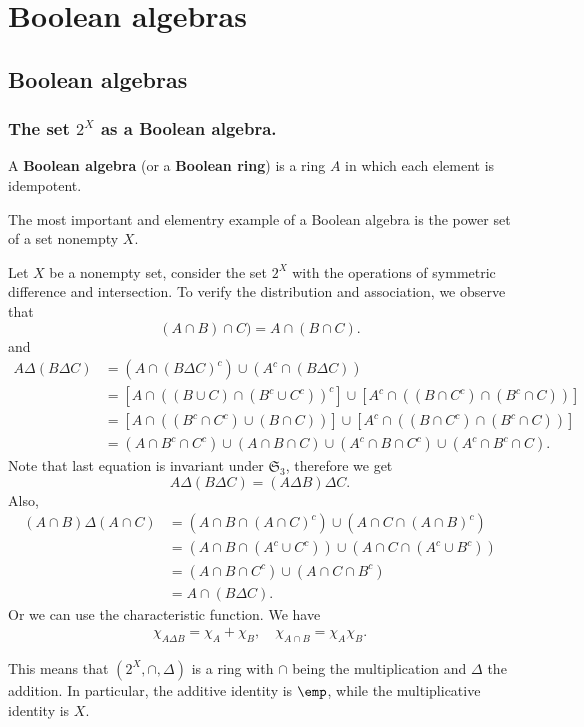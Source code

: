 \chapter{Boolean algebras}
\section{Boolean algebras}
\subsection{The set $2^X$ as a Boolean algebra.}
\begin{definition}
A \textbf{Boolean algebra} (or a \textbf{Boolean ring}) is a ring $A$ in which each element is idempotent.
\end{definition}
The most important and elementry example of a Boolean algebra is the power set of a set nonempty $X$.
\begin{example}\label{Bool ring 2^X}
Let $X$ be a nonempty set, consider the set $2^X$ with the operations of symmetric difference and intersection. 
To verify the distribution and association, we observe that
\[(A\cap B)\cap C)=A\cap(B\cap C).\]
and
\begin{align*}
A\Delta(B\Delta C)&=(A\cap(B\Delta C)^c)\cup(A^c\cap(B\Delta C))\\
&=[A\cap((B\cup C)\cap(B^c\cup C^c))^c]\cup[A^c\cap((B\cap C^c)\cap(B^c\cap C))]\\
&=[A\cap((B^c\cap C^c)\cup(B\cap C))]\cup[A^c\cap((B\cap C^c)\cap(B^c\cap C))]\\
&=(A\cap B^c\cap C^c)\cup(A\cap B\cap C)\cup(A^c\cap B\cap C^c)\cup(A^c\cap B^c\cap C).
\end{align*}
Note that last equation is invariant under $\mathfrak{S}_3$, therefore we get
\[A\Delta(B\Delta C)=(A\Delta B)\Delta C.\]
Also,
\begin{align*}
(A\cap B)\Delta(A\cap C)&=(A\cap B\cap(A\cap C)^c)\cup(A\cap C\cap(A\cap B)^c)\\
&=(A\cap B\cap(A^c\cup C^c))\cup(A\cap C\cap(A^c\cup B^c))\\
&=(A\cap B\cap C^c)\cup(A\cap C\cap B^c)\\
&=A\cap(B\Delta C).
\end{align*} 
Or we can use the characteristic function. We have
\begin{align*}
\chi_{A\Delta B}=\chi_A+\chi_{B},\quad \chi_{A\cap B}=\chi_A\chi_B.
\end{align*}

This means that $(2^X,\cap,\Delta)$ is a ring with $\cap$ being the multiplication and $\Delta$ the addition. In particular, the additive identity is $\emp$, while the multiplicative identity is $X$. 
\end{example}
